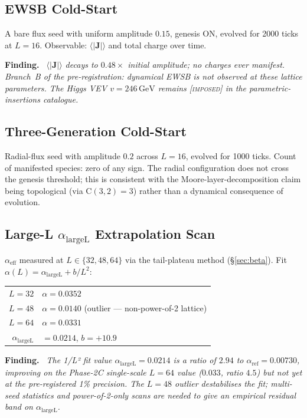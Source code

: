 \documentclass[11pt,letterpaper]{article}
\newcommand{\alphaREF}{\alpha_{\mathrm{ref}}}
\newcommand{\alphaLargeL}{\alpha_{\mathrm{largeL}}}
\newcommand{\GeV}{\,\mathrm{GeV}}
\newenvironment{finding}{\par\medskip\noindent\textbf{Finding.}\itshape\ }{\par\medskip}
\begin{document}
\subsection{EWSB Cold-Start}

A bare flux seed with uniform amplitude $0.15$, genesis ON, evolved
for 2000 ticks at $L = 16$. Observable: $\langle|\mathbf{J}|\rangle$
and total charge over time.

\begin{finding}
$\langle|\mathbf{J}|\rangle$ decays to $0.48\times$ initial amplitude;
no charges ever manifest. Branch~B of the pre-registration: dynamical
EWSB is \emph{not} observed at these lattice parameters. The Higgs VEV
$v = 246 \GeV$ remains [\textsc{imposed}] in the parametric-insertions
catalogue.
\end{finding}

\subsection{Three-Generation Cold-Start}

Radial-flux seed with amplitude $0.2$ across $L = 16$, evolved for
1000 ticks. Count of manifested species: zero of any sign. The radial
configuration does not cross the genesis threshold; this is consistent
with the Moore-layer-decomposition claim being topological (via
$\mathrm{C}(3,2) = 3$) rather than a dynamical consequence of evolution.

\subsection{Large-L $\alphaLargeL$ Extrapolation Scan}

$\alpha_{\mathrm{eff}}$ measured at $L \in \{32, 48, 64\}$ via the
tail-plateau method (\S\ref{sec:beta}). Fit $\alpha(L) =
\alphaLargeL + b/L^2$:

\begin{center}
\begin{tabular}{rl}
$L = 32$ & $\alpha = 0.0352$ \\
$L = 48$ & $\alpha = 0.0140$ (outlier --- non-power-of-2 lattice) \\
$L = 64$ & $\alpha = 0.0331$ \\
\hline
$\alphaLargeL$ & $= 0.0214$, $b = +10.9$ \\
\end{tabular}
\end{center}

\begin{finding}
The 1/L² fit value $\alphaLargeL = 0.0214$ is a ratio of $2.94$ to
$\alphaREF = 0.00730$, improving on the Phase-2C single-scale $L = 64$
value ($0.033$, ratio $4.5$) but not yet at the pre-registered
1\% precision. The $L = 48$ outlier destabilises the fit;
multi-seed statistics and power-of-2-only scans are needed to give an
empirical residual band on $\alphaLargeL$.
\end{finding}
\end{document}
